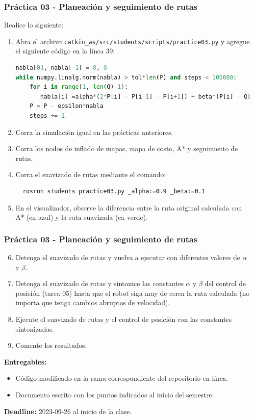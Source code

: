 \begin{frame}[containsverbatim]\frametitle{Práctica 03 - Planeación y seguimiento de rutas}
  Realice lo siguiente:
  \begin{enumerate}
     \item Abra el archivo \texttt{catkin\_ws/src/students/scripts/practice03.py} y agregue el siguiente código en la línea 39:
  \begin{lstlisting}[language=Python,firstnumber=39]
nabla[0], nabla[-1] = 0, 0
while numpy.linalg.norm(nabla) > tol*len(P) and steps < 100000:
    for i in range(1, len(Q)-1):
       nabla[i] =alpha*(2*P[i] - P[i-1] - P[i+1]) + beta*(P[i] - Q[i])
    P = P - epsilon*nabla
    steps += 1
  \end{lstlisting}
  \item Corra la simulación igual en las prácticas anteriores. 
  \item Corra los nodos de inflado de mapas, mapa de costo, A* y seguimiento de rutas.
  \item Corra el suavizado de rutas mediante el comando:
    \begin{verbatim}
  rosrun students practice03.py _alpha:=0.9 _beta:=0.1
\end{verbatim}
  \item En el visualizador, observe la diferencia entre la ruta original calculada con A* (en azul) y la ruta suavizada (en verde). 
  \end{enumerate}
\end{frame}


\begin{frame}[containsverbatim]\frametitle{Práctica 03 - Planeación y seguimiento de rutas}
  \begin{enumerate}
    \setcounter{enumi}{5}
    \item Detenga el suavizado de rutas y vuelva a ejecutar con diferentes valores de $\alpha$ y $\beta$.
  \item Detenga el suavizado de rutas y sintonice las constantes $\alpha$ y $\beta$ del control de posición (tarea 05) hasta que el robot siga muy de cerca la ruta calculada (no importa que tenga cambios abruptos de velocidad).
  \item Ejecute el suavizado de rutas y el control de posición con las constantes sintonizadas.
  \item Comente los resultados.
  \end{enumerate}
 \textbf{Entregables:}
  \begin{itemize}
  \item Código modificado en la rama correspondiente del repositorio en línea.
  \item Documento escrito con los puntos indicados al inicio del semestre.
  \end{itemize}
  \textbf{Deadline: } 2023-09-26 al inicio de la clase. 
\end{frame}


